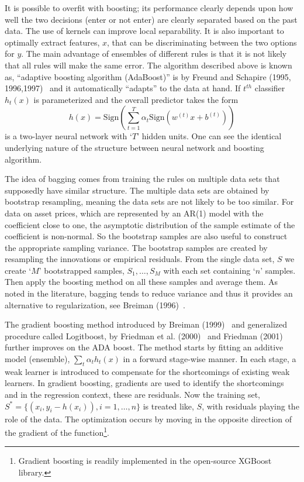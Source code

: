  
It is possible to overfit with boosting; its performance clearly depends upon how well the two decisions (enter or not enter) are clearly separated based on the past data. The use of kernels can improve local separability. It is also important to optimally extract features, $x$, that can be discriminating between the two options for $y$. The main advantage of ensembles of different rules is that it is not likely that all rules will make the same error. The algorithm described above is known as, ``adaptive boosting algorithm (AdaBoost)'' is by Freund and Schapire (1995, 1996,1997)~\cite{freund1995decision,freund1996experiments,freund1997decision} and it automatically ``adapts'' to the data at hand. If $t^{th}$ classifier $h_t(x)$ is parameterized and the overall predictor takes the form
	\begin{equation} \label{eq:hxsign}
	h(x)=\text{Sign} \left( \sum_{t=1}^T \alpha_t \text{Sign}(w^{(t)}x+b^{(t)}) \right)
	\end{equation}
is a two-layer neural network with `$T$' hidden units. One can see the identical underlying nature of the structure between neural network and boosting algorithm.


The idea of bagging comes from training the rules on multiple data sets that supposedly have similar structure. The multiple data sets are obtained by bootstrap  resampling, meaning the data sets are not likely to be too similar. For data on asset prices, which are represented by an AR(1) model with the coefficient close to one, the asymptotic distribution of the sample estimate of the coefficient is non-normal. So the bootstrap samples are also useful to construct the appropriate sampling variance. The bootstrap samples are created by resampling the innovations or empirical residuals. From the single data set, $S$ we create `$M$' bootstrapped samples, $S_1, \ldots, S_M$ with each set containing `$n$' samples. Then apply the boosting method on all these samples and average them. As noted in the literature, bagging tends to reduce variance and thus it provides an alternative to regularization, see Breiman (1996)~\cite{breiman1996bagging}.\label{in:bagging_end}


The gradient boosting method introduced by Breiman (1999)~\cite{breiman1999prediction} and generalized procedure called Logitboost, by Friedman et al. (2000)~\cite{friedman2000additive} and Friedman (2001)~\cite{friedman2001greedy} further improves on the ADA boost. The method starts by fitting an additive model (ensemble), $\sum_t \alpha_t h_t (x)$ in a forward stage-wise manner. In each stage, a weak learner is introduced to compensate for the shortcomings of existing weak learners. In gradient boosting, gradients are used to identify the shortcomings and in the regression context, these are residuals. Now the training set, $S^*=\{ (x_i, y_i-h(x_i)) , i =1,\ldots,n \}$ is treated like, $S$, with residuals playing the role of the data. The optimization occurs by moving in the opposite direction of the gradient of the function\footnote{Gradient boosting is readily implemented in the open-source XGBoost library.}. \label{in:adv_model_end}



